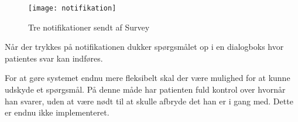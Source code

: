 \begin{figure}
	\centering
	\texttt{[image: notifikation]}
	\caption{Tre notifikationer sendt af Survey}\label{noti}
\end{figure}

Når der trykkes på notifikationen dukker spørgsmålet op i en dialogboks hvor patientes svar kan indføres.

For at gøre systemet endnu mere fleksibelt skal der være mulighed for at kunne udskyde et spørgsmål.
På denne måde har patienten fuld kontrol over hvornår han svarer, uden at være nødt til at skulle afbryde det han er i gang med.
Dette er endnu ikke implementeret.